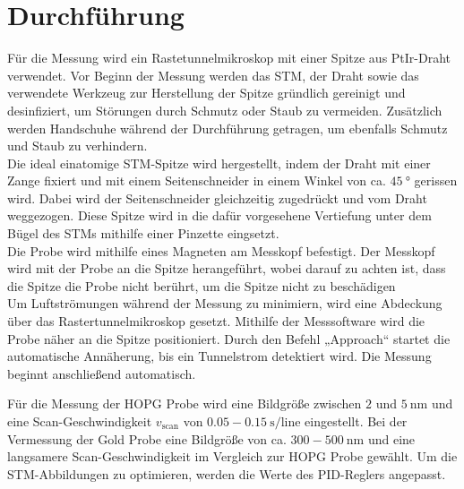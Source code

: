 \section{Durchführung}
\label{sec:Durchführung}
Für die Messung wird ein Rastetunnelmikroskop mit einer Spitze aus PtIr-Draht verwendet. 
Vor Beginn der Messung werden das STM, der Draht sowie das verwendete Werkzeug zur Herstellung der Spitze gründlich gereinigt und desinfiziert, um Störungen durch Schmutz oder Staub zu vermeiden. Zusätzlich werden Handschuhe während der Durchführung getragen, um ebenfalls Schmutz und Staub zu verhindern.\\

Die ideal einatomige STM-Spitze wird hergestellt, indem der Draht mit einer Zange fixiert und mit einem Seitenschneider in einem Winkel von ca. $\SI{45}{\degree}$ gerissen wird. 
Dabei wird der Seitenschneider gleichzeitig zugedrückt und vom Draht weggezogen. 
Diese Spitze wird in die dafür vorgesehene Vertiefung unter dem Bügel des STMs mithilfe einer Pinzette eingsetzt. \\

Die Probe wird mithilfe eines Magneten am Messkopf befestigt. 
Der Messkopf wird mit der Probe an die Spitze herangeführt, wobei darauf zu achten ist, dass die Spitze die Probe nicht berührt, um die Spitze nicht zu beschädigen\\

Um Luftströmungen während der Messung zu minimiern, wird eine Abdeckung über das Rastertunnelmikroskop gesetzt. Mithilfe der Messsoftware wird die Probe näher an die Spitze positioniert. Durch den Befehl „Approach“ startet die automatische Annäherung, bis ein Tunnelstrom detektiert wird. Die Messung beginnt anschließend automatisch.

Für die Messung der HOPG Probe wird eine Bildgröße zwischen $2$ und $\SI{5}{\nano\meter}$ und eine Scan-Geschwindigkeit $v_{\text{scan}}$ von $\SI{0.05}-\SI{0.15}{\second\per\text{line}}$ eingestellt. Bei der Vermessung der Gold Probe eine Bildgröße von ca. $\SI{300}-\SI{500}{\nano\meter}$ und eine langsamere Scan-Geschwindigkeit im Vergleich zur HOPG Probe gewählt. Um die STM-Abbildungen zu optimieren, werden die Werte des PID-Reglers angepasst. 